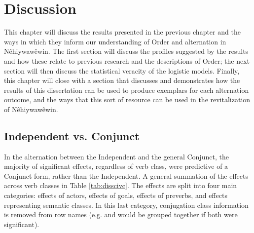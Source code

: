 \chapter{Discussion}
\label{ch:discussion}

This chapter will discuss the results presented in the previous chapter and the ways in which they inform our understanding of Order and alternation in Nêhiywawêwin. The first section will discuss the profiles suggested by the results and how these relate to previous research and the descriptions of Order; the next section will then discuss the statistical veracity of the logistic models. Finally, this chapter will close with a section that discusses and demonstrates how the results of this dissertation can be used to produce exemplars for each alternation outcome, and the ways that this sort of resource can be used in the revitalization of Nêhiywawêwin.

\section{Independent vs. Conjunct}
In the alternation between the Independent and the general Conjunct, the majority of significant effects, regardless of verb class, were predictive of a Conjunct form, rather than the Independent. A general summation of the effects across verb classes in Table \ref{tab:disscivc}. The effects are split into four main categories: effects of actors, effects of goals, effects of preverbs, and effects representing semantic classes. In this last category, conjugation class information is removed from row names (e.g. and  would be grouped together if both were significant). 


